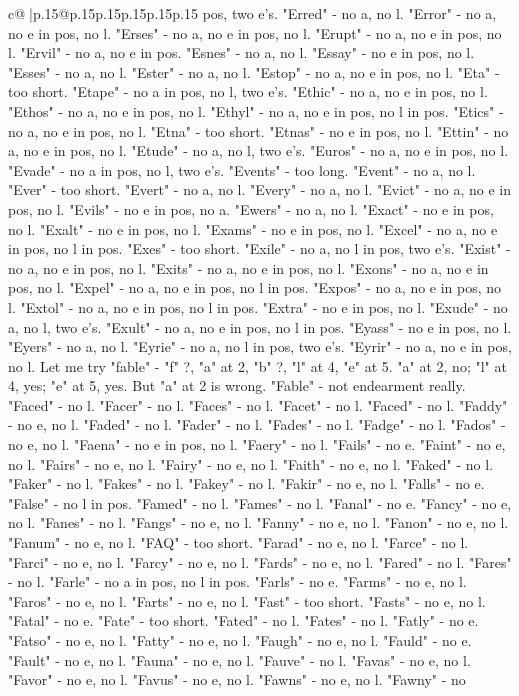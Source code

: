 \documentclass{article}
\begin{document}
{\begin{supertabular}{c@{$\;$}|p{.15\linewidth}@{}p{.15\linewidth}p{.15\linewidth}p{.15\linewidth}p{.15\linewidth}p{.15\linewidth}}
{{{pos, two e's. "Erred" {-} no a, no l. "Error" {-} no a, no e in pos, no l. "Erses" {-} no a, no e in pos, no l. "Erupt" {-} no a, no e in pos, no l. "Ervil" {-} no a, no e in pos. "Esnes" {-} no a, no l. "Essay" {-} no e in pos, no l. "Esses" {-} no a, no l. "Ester" {-} no a, no l. "Estop" {-} no a, no e in pos, no l. "Eta" {-} too short. "Etape" {-} no a in pos, no l, two e's. "Ethic" {-} no a, no e in pos, no l. "Ethos" {-} no a, no e in pos, no l. "Ethyl" {-} no a, no e in pos, no l in pos. "Etics" {-} no a, no e in pos, no l. "Etna" {-} too short. "Etnas" {-} no e in pos, no l. "Ettin" {-} no a, no e in pos, no l. "Etude" {-} no a, no l, two e's. "Euros" {-} no a, no e in pos, no l. "Evade" {-} no a in pos, no l, two e's. "Events" {-} too long. "Event" {-} no a, no l. "Ever" {-} too short. "Evert" {-} no a, no l. "Every" {-} no a, no l. "Evict" {-} no a, no e in pos, no l. "Evils" {-} no e in pos, no a. "Ewers" {-} no a, no l. "Exact" {-} no e in pos, no l. "Exalt" {-} no e in pos, no l. "Exams" {-} no e in pos, no l. "Excel" {-} no a, no e in pos, no l in pos. "Exes" {-} too short. "Exile" {-} no a, no l in pos, two e's. "Exist" {-} no a, no e in pos, no l. "Exits" {-} no a, no e in pos, no l. "Exons" {-} no a, no e in pos, no l. "Expel" {-} no a, no e in pos, no l in pos. "Expos" {-} no a, no e in pos, no l. "Extol" {-} no a, no e in pos, no l in pos. "Extra" {-} no e in pos, no l. "Exude" {-} no a, no l, two e's. "Exult" {-} no a, no e in pos, no l in pos. "Eyass" {-} no e in pos, no l. "Eyers" {-} no a, no l. "Eyrie" {-} no a, no l in pos, two e's. "Eyrir" {-} no a, no e in pos, no l. Let me try "fable" {-} "f" ?, "a" at 2, "b" ?, "l" at 4, "e" at 5. "a" at 2, no; "l" at 4, yes; "e" at 5, yes. But "a" at 2 is wrong. "Fable" {-} not endearment really. "Faced" {-} no l. "Facer" {-} no l. "Faces" {-} no l. "Facet" {-} no l. "Faced" {-} no l. "Faddy" {-} no e, no l. "Faded" {-} no l. "Fader" {-} no l. "Fades" {-} no l. "Fadge" {-} no l. "Fados" {-} no e, no l. "Faena" {-} no e in pos, no l. "Faery" {-} no l. "Fails" {-} no e. "Faint" {-} no e, no l. "Fairs" {-} no e, no l. "Fairy" {-} no e, no l. "Faith" {-} no e, no l. "Faked" {-} no l. "Faker" {-} no l. "Fakes" {-} no l. "Fakey" {-} no l. "Fakir" {-} no e, no l. "Falls" {-} no e. "False" {-} no l in pos. "Famed" {-} no l. "Fames" {-} no l. "Fanal" {-} no e. "Fancy" {-} no e, no l. "Fanes" {-} no l. "Fangs" {-} no e, no l. "Fanny" {-} no e, no l. "Fanon" {-} no e, no l. "Fanum" {-} no e, no l. "FAQ" {-} too short. "Farad" {-} no e, no l. "Farce" {-} no l. "Farci" {-} no e, no l. "Farcy" {-} no e, no l. "Fards" {-} no e, no l. "Fared" {-} no l. "Fares" {-} no l. "Farle" {-} no a in pos, no l in pos. "Farls" {-} no e. "Farms" {-} no e, no l. "Faros" {-} no e, no l. "Farts" {-} no e, no l. "Fast" {-} too short. "Fasts" {-} no e, no l. "Fatal" {-} no e. "Fate" {-} too short. "Fated" {-} no l. "Fates" {-} no l. "Fatly" {-} no e. "Fatso" {-} no e, no l. "Fatty" {-} no e, no l. "Faugh" {-} no e, no l. "Fauld" {-} no e. "Fault" {-} no e, no l. "Fauna" {-} no e, no l. "Fauve" {-} no l. "Favas" {-} no e, no l. "Favor" {-} no e, no l. "Favus" {-} no e, no l. "Fawns" {-} no e, no l. "Fawny" {-} no }}}
\end{supertabular}}
\end{document}
